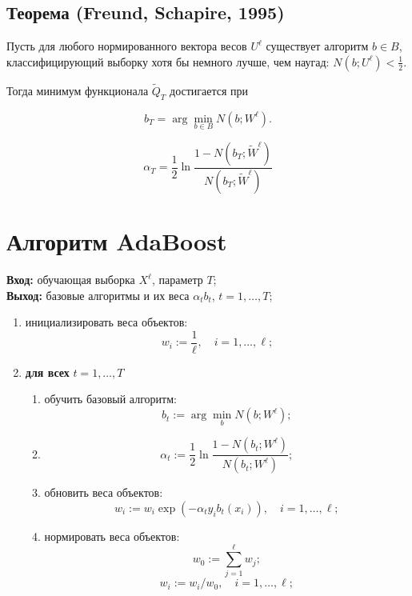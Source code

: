 \subsection*{Теорема (Freund, Schapire, 1995)}

Пусть для любого нормированного вектора весов $U^\ell$ существует алгоритм $b \in B$, классифицирующий выборку хотя бы немного лучше, чем наугад: $N(b; U^\ell) < \frac{1}{2}$.

Тогда минимум функционала $\tilde{Q}_T$ достигается при

\[
    b_T = \arg \min_{b \in B} N(b; W^\ell).
\]

\[
    \alpha_T = \frac{1}{2} \ln \frac{1 - N(b_T; \tilde{W}^\ell)}{N(b_T; \tilde{W}^\ell)}
\]


\section*{Алгоритм AdaBoost}

\textbf{Вход:} обучающая выборка $X^\ell$, параметр $T$;\\
\textbf{Выход:} базовые алгоритмы и их веса $\alpha_t b_t$, $t = 1, \ldots, T$;

\begin{enumerate}
    \item инициализировать веса объектов:
          \[
              w_i := \frac{1}{\ell}, \quad i = 1, \ldots, \ell;
          \]
    \item \textbf{для всех} $t = 1, \ldots, T$
          \begin{enumerate}
              \item обучить базовый алгоритм:
                    \[
                        b_t := \arg \min_b N(b; W^\ell);
                    \]
              \item
                    \[
                        \alpha_t := \frac{1}{2} \ln \frac{1 - N(b_t; W^\ell)}{N(b_t; W^\ell)};
                    \]
              \item обновить веса объектов:
                    \[
                        w_i := w_i \exp(-\alpha_t y_i b_t(x_i)), \quad i = 1, \ldots, \ell;
                    \]
              \item нормировать веса объектов:
                    \[
                        w_0 := \sum_{j=1}^{\ell} w_j;
                    \]
                    \[
                        w_i := w_i / w_0, \quad i = 1, \ldots, \ell;
                    \]
          \end{enumerate}
\end{enumerate}

